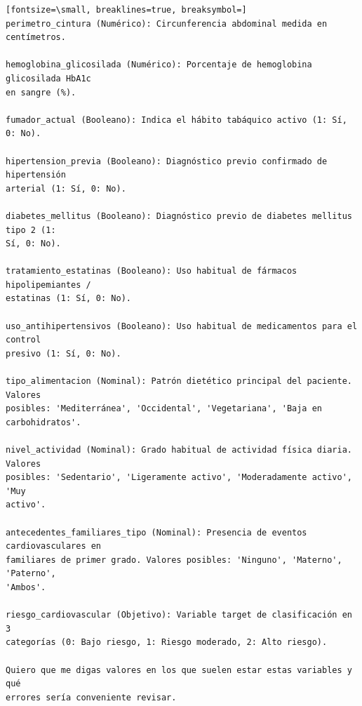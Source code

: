 \documentclass[12pt,a4paper,oneside]{book}
\begin{document}
\begin{iaprompt}
\begin{Verbatim}[fontsize=\small, breaklines=true, breaksymbol=]
perimetro_cintura (Numérico): Circunferencia abdominal medida en centímetros.

hemoglobina_glicosilada (Numérico): Porcentaje de hemoglobina glicosilada HbA1c
en sangre (%).

fumador_actual (Booleano): Indica el hábito tabáquico activo (1: Sí, 0: No).

hipertension_previa (Booleano): Diagnóstico previo confirmado de hipertensión
arterial (1: Sí, 0: No).

diabetes_mellitus (Booleano): Diagnóstico previo de diabetes mellitus tipo 2 (1:
Sí, 0: No).

tratamiento_estatinas (Booleano): Uso habitual de fármacos hipolipemiantes /
estatinas (1: Sí, 0: No).

uso_antihipertensivos (Booleano): Uso habitual de medicamentos para el control
presivo (1: Sí, 0: No).

tipo_alimentacion (Nominal): Patrón dietético principal del paciente. Valores
posibles: 'Mediterránea', 'Occidental', 'Vegetariana', 'Baja en carbohidratos'.

nivel_actividad (Nominal): Grado habitual de actividad física diaria. Valores
posibles: 'Sedentario', 'Ligeramente activo', 'Moderadamente activo', 'Muy
activo'.

antecedentes_familiares_tipo (Nominal): Presencia de eventos cardiovasculares en
familiares de primer grado. Valores posibles: 'Ninguno', 'Materno', 'Paterno',
'Ambos'.

riesgo_cardiovascular (Objetivo): Variable target de clasificación en 3
categorías (0: Bajo riesgo, 1: Riesgo moderado, 2: Alto riesgo).

Quiero que me digas valores en los que suelen estar estas variables y qué
errores sería conveniente revisar.
\end{Verbatim}
\end{iaprompt}
\end{document}
